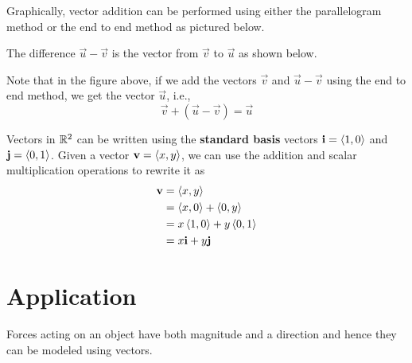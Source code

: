 \documentclass[handout]{ximera}
\begin{document}
Graphically, vector addition can be performed using either the parallelogram method or the end to end method as pictured below.
\begin{image}
\end{image}

The difference $\vec{u} - \vec{v}$ is the vector from $\vec{v}$ to $\vec{u}$ as shown below.
\begin{image}
\end{image}
Note that in the figure above, if we add the vectors $\vec{v}$ and $\vec{u} -\vec{v}$ using the end to end method, 
we get the vector $\vec{u}$, i.e.,
\[
\vec{v} + \left(\vec{u} -\vec{v}\right) = \vec{u}
\]

Vectors in $\mathbb R^2$ can be written using the {\bf standard basis} vectors $\mathbf{i} = \left\langle 1,0\right\rangle$ and $\mathbf{j} = \left\langle 0,1\right\rangle$.  
Given a vector $\mathbf{v} = \left\langle x,y\right\rangle$, we can use the addition and scalar multiplication operations to rewrite it as
\begin{align*}
\mathbf{v} &= \left\langle x,y\right\rangle\\
         &= \left\langle x,0\right\rangle + \left\langle 0,y\right\rangle\\
         &= x\left\langle 1,0\right\rangle + y \left\langle 0,1\right\rangle\\
         &= x\mathbf{i} + y\mathbf{j}
\end{align*}



\section{Application}
Forces acting on an object have both magnitude and a direction and hence they can be modeled using vectors.
\end{document}
